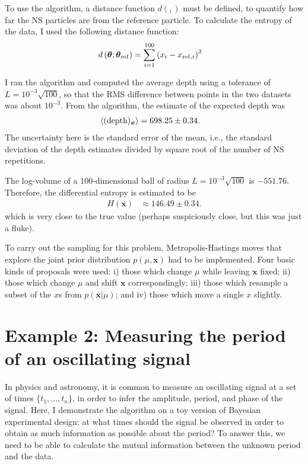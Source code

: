 \documentclass[entropy,article,accept,oneauthor,pdftex,10pt,a4paper]{mdpi}
\newcommand{\x}{\boldsymbol{\theta}}
\newcommand{\depth}{(\textnormal{depth})}
\newcommand{\xref}{\x_{\rm ref}}
\begin{document}
To use the algorithm, a distance function $d(,)$ must be defined, to quantify
how far the NS particles are from the reference particle. To calculate
the entropy of the data, I used the following distance function:
\begin{align}
d\left(\x; \xref\right) &= \sum_{i=1}^{100}\left(x_i - x_{{\rm ref}, i}\right)^2
\end{align}

I ran the algorithm and computed the average depth using a tolerance of
$L=10^{-3}\sqrt{100}$, so that the RMS difference between
points in the two datasets was about $10^{-3}$.
From the algorithm, the estimate of the expected depth was
\begin{align}
\left<\depth_{\boldsymbol{x}}\right> &= 698.25 \pm 0.34.
\end{align}
The uncertainty here is the standard error of the mean, i.e., the
standard deviation of the depth estimates divided by square root of
the number of NS repetitions.

The log-volume of a 100-dimensional ball of radius
$L=10^{-3}\sqrt{100}$ is
$-551.76$. Therefore, the differential entropy is estimated to be
\begin{align}
H(\boldsymbol{x}) &\approx 146.49 \pm 0.34.
\end{align}
which is very close to the true value (perhaps suspiciously close, but this
was just a fluke).

To carry out the sampling for this problem, Metropolis-Hastings moves that
explore the joint prior distribution $p(\mu, \boldsymbol{x})$ had to be
implemented. Four basic kinds of proposals were used: i) those which change
$\mu$ while leaving $\boldsymbol{x}$ fixed; ii) those which change $\mu$ and
shift $\boldsymbol{x}$ correspondingly; iii) those which resample a subset
of the $x$s from $p(\boldsymbol{x}|\mu)$; and iv) those which move a single
$x$ slightly.

\section{Example 2: Measuring the period of an oscillating signal}

In physics and astronomy, it is common to measure an oscillating signal
at a set of times $\{t_1, ..., t_n\}$, in order to infer the amplitude,
period, and phase of the signal.
Here, I demonstrate the algorithm on a toy version
of Bayesian experimental design: at what times should the signal be
observed in order to obtain as much information as possible about the
period? To answer this, we need to be able to calculate the mutual
information between the unknown period and the data.
\end{document}
